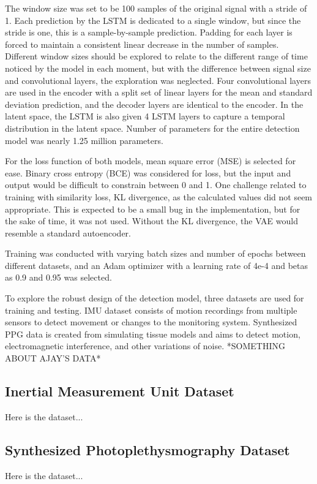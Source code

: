 \documentclass[conference]{IEEEtran}
\begin{document}
The window size was set to be 100 samples of the original signal with a stride of 1. Each prediction by the LSTM is dedicated to a single window, but since the stride is one, this is a sample-by-sample prediction. Padding for each layer is forced to maintain a consistent linear decrease in the number of samples. Different window sizes should be explored to relate to the different range of time noticed by the model in each moment, but with the difference between signal size and convolutional layers, the exploration was neglected. Four convolutional layers are used in the encoder with a split set of linear layers for the mean and standard deviation prediction, and the decoder layers are identical to the encoder. In the latent space, the LSTM is also given 4 LSTM layers to capture a temporal distribution in the latent space. Number of parameters for the entire detection model was nearly 1.25 million parameters.

For the loss function of both models, mean square error (MSE) is selected for ease. Binary cross entropy (BCE) was considered for loss, but the input and output would be difficult to constrain between 0 and 1. One challenge related to training with similarity loss, KL divergence, as the calculated values did not seem appropriate. This is expected to be a small bug in the implementation, but for the sake of time, it was not used. Without the KL divergence, the VAE would resemble a standard autoencoder.

Training was conducted with varying batch sizes and number of epochs between different datasets, and an Adam optimizer with a learning rate of 4e-4 and betas as 0.9 and 0.95 was selected. 

To explore the robust design of the detection model, three datasets are used for training and testing. IMU dataset consists of motion recordings from multiple sensors to detect movement or changes to the monitoring system. Synthesized PPG data is created from simulating tissue models and aims to detect motion, electromagnetic interference, and other variations of noise. *SOMETHING ABOUT AJAY’S DATA*

\subsection{Inertial Measurement Unit Dataset}
Here is the dataset...

\subsection{Synthesized Photoplethysmography Dataset}
Here is the dataset...
\end{document}
